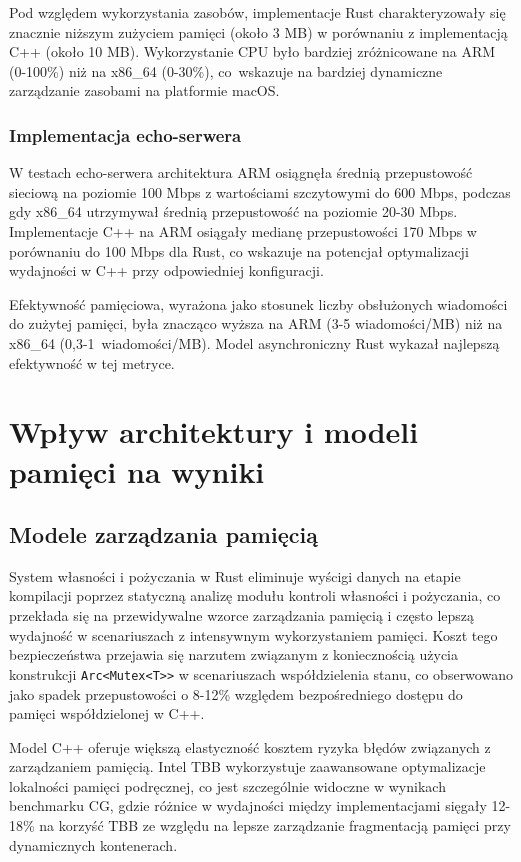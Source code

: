 Pod względem wykorzystania zasobów, implementacje Rust charakteryzowały się znacznie niższym zużyciem pamięci (około 3 MB) w porównaniu z implementacją C++ (około 10 MB). Wykorzystanie CPU było bardziej zróżnicowane na ARM (0-100\%) niż na x86\_64 (0-30\%), co~wskazuje na bardziej dynamiczne zarządzanie zasobami na platformie macOS.

\subsubsection{Implementacja echo-serwera}

W testach echo-serwera architektura ARM osiągnęła średnią przepustowość sieciową na poziomie 100 Mbps z wartościami szczytowymi do 600 Mbps, podczas gdy x86\_64 utrzymywał średnią przepustowość na poziomie 20-30 Mbps. Implementacje C++ na ARM osiągały medianę przepustowości 170 Mbps w porównaniu do 100 Mbps dla Rust, co wskazuje na potencjał optymalizacji wydajności w C++ przy odpowiedniej konfiguracji.

Efektywność pamięciowa, wyrażona jako stosunek liczby obsłużonych wiadomości do zużytej pamięci, była znacząco wyższa na ARM (3-5 wiadomości/MB) niż na x86\_64 \mbox{(0,3-1 wiadomości/MB)}. Model asynchroniczny Rust wykazał najlepszą efektywność w tej metryce.

\section{Wpływ architektury i modeli pamięci na wyniki}

\subsection{Modele zarządzania pamięcią}

System własności i pożyczania w Rust eliminuje wyścigi danych na etapie kompilacji poprzez statyczną analizę modułu kontroli własności i pożyczania, co przekłada się na przewidywalne wzorce zarządzania pamięcią i często lepszą wydajność w scenariuszach z intensywnym wykorzystaniem pamięci. Koszt tego bezpieczeństwa przejawia się narzutem związanym z koniecznością użycia konstrukcji \texttt{Arc<Mutex<T>>} w scenariuszach współdzielenia stanu, co obserwowano jako spadek przepustowości o 8-12\% względem bezpośredniego dostępu do pamięci współdzielonej w C++.

Model C++ oferuje większą elastyczność kosztem ryzyka błędów związanych z zarządzaniem pamięcią. Intel TBB wykorzystuje zaawansowane optymalizacje lokalności pamięci podręcznej, co jest szczególnie widoczne w wynikach benchmarku CG, gdzie różnice w wydajności między implementacjami sięgały 12-18\% na korzyść TBB ze względu na lepsze zarządzanie fragmentacją pamięci przy dynamicznych kontenerach.

